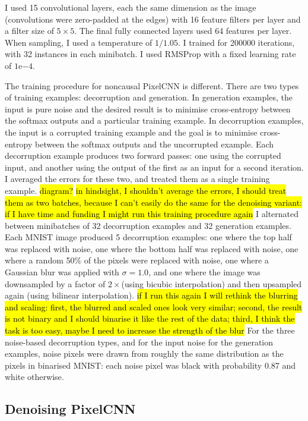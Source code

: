 \documentclass[10pt,a4paper]{article}
\begin{document}
I used 15 convolutional layers, each the same dimension as the image (convolutions were zero-padded at the edges) with 16 feature filters per layer and a filter size of $5\times 5$. The final fully connected layers used 64 features per layer. When sampling, I used a temperature of $1/1.05$. I trained for 200000 iterations, with 32 instances in each minibatch. I used RMSProp with a fixed learning rate of $1\mathrm{e}{-4}$.

The training procedure for noncausal PixelCNN is different. There are two types of training examples: decorruption and generation. In generation examples, the input is pure noise and the desired result is to minimise cross-entropy between the softmax outputs and a particular training example. In decorruption examples, the input is a corrupted training example and the goal is to minimise cross-entropy between the softmax outputs and the uncorrupted example. Each decorruption example produces two forward passes: one using the corrupted input, and another using the output of the first as an input for a second iteration. I averaged the errors for these two, and treated them as a single training example. \hl{diagram?} \hl{in hindsight, I shouldn't average the errors, I should treat them as two batches, because I can't easily do the same for the denoising variant: if I have time and funding I might run this training procedure again} I alternated between minibatches of 32 decorruption examples and 32 generation examples. Each MNIST image produced 5 decorruption examples: one where the top half was replaced with noise, one where the bottom half was replaced with noise, one where a random 50\% of the pixels were replaced with noise, one where a Gaussian blur was applied with $\sigma=1.0$, and one where the image was downsampled by a factor of $2\times$(using bicubic interpolation) and then upsampled again (using bilinear interpolation). \hl{if I run this again I will rethink the blurring and scaling: first, the blurred and scaled ones look very similar; second, the result is not binary and I should binarise it like the rest of the data; third, I think the task is too easy, maybe I need to increase the strength of the blur} For the three noise-based decorruption types, and for the input noise for the generation examples, noise pixels were drawn from roughly the same distribution as the pixels in binarised MNIST: each noise pixel was black with probability 0.87 and white otherwise.

\subsection{Denoising PixelCNN}
\end{document}
